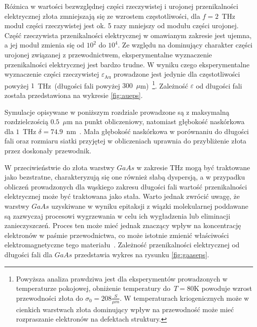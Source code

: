 Różnica w wartości bezwzględnej części rzeczywistej i urojonej przenikalności elektrycznej złota zmniejszają się ze wzrostem częstotliwości, dla $f=2$~THz moduł części rzeczywistej jest ok. 5 razy mniejszy od modułu części urojonej. Część rzeczywista przenikalności elektrycznej w omawianym zakresie jest ujemna, a jej moduł zmienia się od $10^2$ do $10^4$. Ze względu na dominujący charakter części urojonej związanej z przewodnictwem, eksperymentalne wyznaczenie przenikalności elektrycznej jest bardzo trudne. W wyniku czego eksperymentalne wyznaczenie części rzeczywistej $\varepsilon_{\textrm{Au}}$ prowadzone jest jedynie dla częstotliwości powyżej $1$~THz~(długości fali powyżej $300$~$\mu$m)~\cite{ordal1983optical}\footnote{Powyższa analiza prawdziwa jest dla eksperymentów prowadzonych w temperaturze pokojowej, obniżenie temperatury do~$T=$80K powoduje wzrost przewodności złota do $\sigma_0=208\frac{S}{\mu m}$. W temperaturach kriogenicznych może w cienkich warstwach złota dominujący wpływ na przewodność może mieć rozpraszanie elektronów na defektach struktury.\cite{lide2009crc}}. Zależność $\varepsilon$ od długości fali została przedstawiona na wykresie \ref{fig:aueps}. 

Symulacje opisywane w poniższym rozdziale prowadzone są z maksymalną rozdzielczością $0.5$~$\mu$m na punkt obliczeniowy, natomiast głębokość naskórkowa dla $1$~THz $\delta=74.9$~nm~\cite{lee2009principles}. Mała głębokość naskórkowa w porównaniu do długości fali oraz rozmiaru siatki przyjętej w obliczeniach uprawnia do przybliżenie złota przez doskonały przewodnik. 

W przeciwieństwie do złota warstwy $GaAs$ w zakresie THz mogą być traktowane jako bezstratne, charakteryzują się one również słabą dyspersją, a w przypadku obliczeń prowadzonych dla wąskiego zakresu długości fali wartość przenikalności elektrycznej może być traktowana jako stała. Warto jednak zwrócić uwagę, że warstwy $GaAs$ uzyskiwane w wyniku epitaksji z wiązki molekularnej poddawane są zazwyczaj procesowi wygrzewania w celu ich wygładzenia lub eliminacji zanieczyszczeń. Proces ten może mieć jednak znaczący wpływ na koncentrację elektronów w paśmie przewodnictwa, co może istotnie zmienić właściwości elektromagnetyczne tego materiału~\cite{zhang2009annealing}. Zależność przenikalności elektrycznej od długości fali dla $GaAs$ przedstawia wykres na rysunku \ref{fig:gaaseps}.


